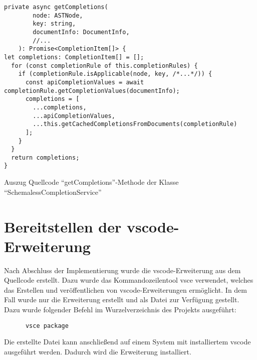 \begin{listing}[t]
      \begin{verbatim}
private async getCompletions(
        node: ASTNode,
        key: string,
        documentInfo: DocumentInfo,
        //...
    ): Promise<CompletionItem[]> {
let completions: CompletionItem[] = [];
  for (const completionRule of this.completionRules) {
    if (completionRule.isApplicable(node, key, /*...*/)) {
      const apiCompletionValues = await completionRule.getCompletionValues(documentInfo);
      completions = [
        ...completions,
        ...apiCompletionValues,
        ...this.getCachedCompletionsFromDocuments(completionRule)
      ];
    }
  }
  return completions;
}
      \end{verbatim}
      \caption{Auszug Quellcode ``getCompletions''-Methode der Klasse ``SchemalessCompletionService''}
      \label{lst:get-completions-schemaless-completion-service}
\end{listing}

\section{Bereitstellen der \acs{vscode}-Erweiterung}

Nach Abschluss der Implementierung wurde die \acs{vscode}-Erweiterung aus dem Quellcode erstellt.
Dazu wurde das Kommandozeilentool \ac{vsce} verwendet, welches das Erstellen und veröffentlichen von
\acs{vscode}-Erweiterungen ermöglicht. In dem Fall wurde nur die Erweiterung erstellt und als
Datei zur Verfügung gestellt.
Dazu wurde folgender Befehl im Wurzelverzeichnis des Projekts ausgeführt:
\begin{verbatim}
      vsce package
\end{verbatim}
Die erstellte Datei kann anschließend auf einem System mit installiertem \ac{vscode} ausgeführt
werden. Dadurch wird die Erweiterung installiert.